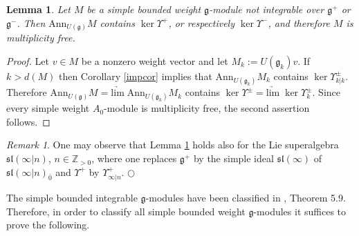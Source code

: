 \documentclass[12pt]{amsart}
\makeatletter
\def\@putname#1#2#3#4{\def\@@ref{#3}\let\old@bf\bf
        \def\bf##1{\old@bf\if?\noexpand##1?{#4}\else##1\fi}%
	#1{#2}%
        \let\bf\old@bf}
\def\@putname#1#2#3#4{\def\@@ref{#3}\let\old@bf\bf	%
	\let\old@reset@font\reset@font			%
        \def\bf##1{\old@bf\if?\noexpand##1?{#4}\else##1\fi}%
	\def\reset@font##1##2{\old@reset@font##1\if?\noexpand##2?{#4}\else##2\fi}#1{#2}%
        \let\bf\old@bf\let\reset@font\old@reset@font}
\let\my@ref=\ref
\def\ref#1{\@putname\my@ref{#1}{#1}{\tiny\rm\@@ref}}
\let\my@cite=\cite
\def\cite#1{\@putname\my@cite{#1}{\@citeb}{\tiny\rm\@@ref}}
\theoremstyle{plain} %
\numberwithin{equation}{section}
\theoremstyle{definition}
\theoremstyle{remark}
\newtheorem{remark}[definition]{Remark} %
\theoremstyle{plain} %
\newtheorem{lemma}[definition]{Lemma}
\renewcommand{\gg}{\mathfrak{g}}
\renewcommand{\sl}{\mathfrak{sl}}
\newcommand{\limarr}{\underrightarrow{\mathrm{lim}} \;}
\newcommand{\Ann}{\mathrm{Ann}}
\def\gg{\mathfrak{g}}
\makeatother
\begin{document}
 
     \begin{lemma}\label{limitsl} Let $M$ be a simple bounded weight $\gg$-module not integrable over $\gg^+$ or  $\gg^-$. Then
       $\Ann_{U(\gg)} M$ contains  $\operatorname{ker}\Upsilon^+$, or respectively $\operatorname{ker}\Upsilon^-$,  and therefore $M$ is multiplicity free.
          \end{lemma}
          \begin{proof} Let $v\in M$ be a nonzero weight vector and let $M_k:=U(\gg_k)v$. If $k>d(M)$ then
            Corollary \ref{impcor} implies that $\Ann_{U(\gg_k)} M_k$ contains $\operatorname{ker}\Upsilon^\pm_{k|k}$. Therefore
            $\Ann_{U(\gg)} M=\limarr \Ann_{U(\gg_k)} M_k$ contains $\operatorname{ker}\Upsilon^\pm=\limarr \operatorname{ker}\Upsilon^\pm_k $. Since every simple weight
            $A_0$-module  is multiplicity free, the second assertion follows. 
          \end{proof}

          \begin{remark} One may observe that Lemma \ref{limitsl} holds also for the Lie superalgebra $\mathfrak{sl}(\infty|n)$, $n\in\mathbb Z_{>0}$,
            where one replaces $\gg^+$ by the simple ideal $\sl(\infty)$ of  $\mathfrak{sl}(\infty|n)_{\bar 0}$ and $\Upsilon^+$ by  $\Upsilon^+_{\infty|n}$.
            \hfill${\bigcirc}$    \end{remark}
     
          

         
The simple bounded integrable $\gg$-modules have been classified in \cite{CP}, Theorem 5.9. Therefore, in order to classify all simple bounded weight $\gg$-modules it suffices to prove the following. 
\end{document}
